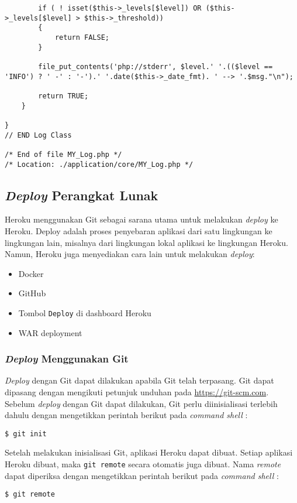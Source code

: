 \begin{lstlisting}
        if ( ! isset($this->_levels[$level]) OR ($this->_levels[$level] > $this->_threshold))
        {
            return FALSE;
        }

        file_put_contents('php://stderr', $level.' '.(($level == 'INFO') ? ' -' : '-').' '.date($this->_date_fmt). ' --> '.$msg."\n");

        return TRUE;
    }

}
// END Log Class

/* End of file MY_Log.php */
/* Location: ./application/core/MY_Log.php */
\end{lstlisting}

\subsection{\textit{Deploy} Perangkat Lunak}
Heroku menggunakan Git sebagai sarana  utama untuk melakukan \textit{deploy} ke Heroku. Deploy adalah proses penyebaran aplikasi dari satu lingkungan ke lingkungan lain, misalnya dari lingkungan lokal aplikasi ke lingkungan Heroku. Namun, Heroku juga menyediakan cara lain untuk melakukan \textit{deploy}:
\begin{itemize}
\item Docker
\item GitHub
\item Tombol \texttt{Deploy} di dashboard Heroku
\item WAR deployment
\end{itemize}

\subsubsection{\textit{Deploy} Menggunakan Git}
\textit{Deploy} dengan Git dapat dilakukan apabila Git telah terpasang. Git dapat dipasang dengan mengikuti petunjuk unduhan pada \url{https://git-scm.com}. Sebelum \textit{deploy} dengan Git dapat dilakukan, Git perlu diinisialisasi terlebih dahulu dengan mengetikkan perintah berikut pada \textit{command shell} :
\begin{lstlisting}
$ git init
\end{lstlisting}

Setelah melakukan inisialisasi Git, aplikasi Heroku dapat dibuat. Setiap aplikasi Heroku dibuat, maka \texttt{git remote} secara otomatis juga dibuat. Nama \textit{remote} dapat diperiksa dengan mengetikkan perintah berikut pada \textit{command shell} :
\begin{lstlisting}
$ git remote
\end{lstlisting}

